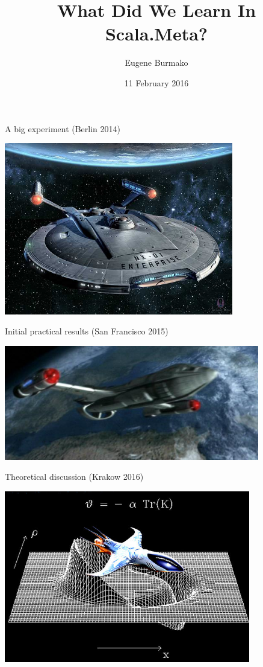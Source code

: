 \documentclass[svgnames,dvipsnames,hyperref={bookmarks=false},usepdftitle=false]{beamer}
\title{What Did We Learn In Scala.Meta?}
\author{Eugene Burmako}
\institute{\'Ecole Polytechnique F\'ed\'erale de Lausanne \\ \texttt{http://scalameta.org/}}
\date{11 February 2016}
\begin{document}
\titleframe

\begin{frame}[c, fragile]{A big experiment (Berlin 2014)}
\begin{center}
\includegraphics[height=7.5cm]{nx01-therealthing.jpg}
\end{center}
\end{frame}

\begin{frame}[c, fragile]{Initial practical results (San Francisco 2015)}
\begin{center}
\includegraphics[height=5cm]{nx-alpha.jpg}
\end{center}
\end{frame}

\begin{frame}[c, fragile]{Theoretical discussion (Krakow 2016)}
\begin{center}
\includegraphics[height=7.5cm]{warp-physics.png}
\end{center}
\end{frame}
\end{document}

